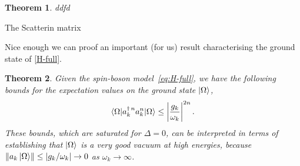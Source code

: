 \documentclass[notitlepage, prx, preprint, amsmath,superscriptaddress,amssymb]{revtex4-1}
\newtheorem{theorem}{Theorem}[section]
\begin{document}
\begin{theorem}
ddfd
\end{theorem}

The Scatterin matrix 

Nice enough we can proof an important (for us) result characterising the ground state of \eqref{H-full}.


\begin{theorem}
\label{th:bound-a}
Given the spin-boson model\ \eqref{eq:H-full}, we have the following bounds for the expectation values on the ground state $\ket{\Omega}$,
\begin{equation}
\braket{\Omega|a_k^{\dagger\,n}a_k^n|\Omega} \leq \left|\frac{g_k}{\omega_k}\right|^{2n}.
\end{equation}
These bounds, which are saturated for $\Delta=0$, can be interpreted in terms of establishing that $\ket{\Omega}$ is a very good vacuum at high energies, because $\Vert{a_k\ket{\Omega}}\Vert \leq |g_k/\omega_k|\to 0$ as $\omega_k\to\infty$.
\end{theorem}
\end{document}
